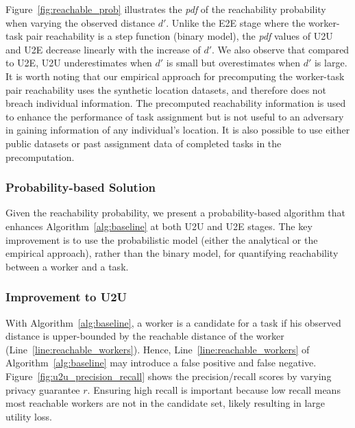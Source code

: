 \documentclass{USC-Thesis}
\numberwithin{equation}{chapter}
\begin{document}
Figure~\ref{fig:reachable_prob} illustrates the \emph{pdf} of the reachability probability when varying the observed distance $d'$. Unlike the E2E stage where the worker-task pair reachability is a step function (binary model), the \emph{pdf} values of U2U and U2E decrease linearly with the increase of $d'$.
We also observe that compared to U2E, U2U underestimates when $d'$ is small but overestimates when $d'$ is large. It is worth noting that our empirical approach for precomputing the worker-task pair reachability uses the synthetic location datasets, and therefore does not breach individual information. The precomputed reachability information is used to enhance the performance of task assignment but is not useful to an adversary in gaining information of any individual's location. It is also possible to use either public datasets or past assignment data of completed tasks in the precomputation.


\subsubsection{Probability-based Solution}
\label{sec:improved}
Given the reachability probability, we present a probability-based algorithm that enhances Algorithm~\ref{alg:baseline} at both U2U and U2E stages. The key improvement is to use the probabilistic model (either the analytical or the empirical approach), rather than the binary model, for quantifying reachability between a worker and a task.

\subsubsection{Improvement to U2U}
\label{sec:u2u_improve}

With Algorithm~\ref{alg:baseline}, a worker is a candidate for a task if his observed distance is upper-bounded by the reachable distance of the worker (Line~\ref{line:reachable_workers}).
Hence, Line~\ref{line:reachable_workers} of Algorithm~\ref{alg:baseline} may introduce a false positive and false negative. Figure~\ref{fig:u2u_precision_recall} shows the precision/recall scores by varying privacy guarantee $r$. Ensuring high recall is important because low recall means most reachable workers are not in the candidate set, likely resulting in large utility loss.
\end{document}
